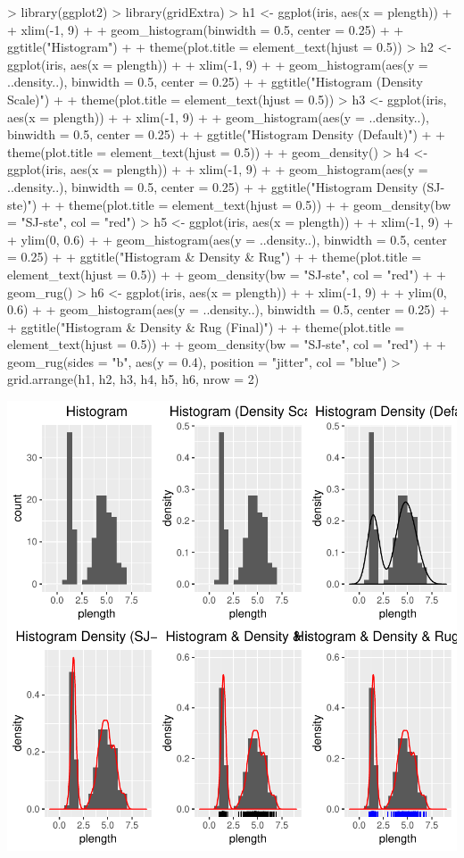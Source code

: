 \documentclass[12pt,letterpaper,final]{article}
\begin{document}
\begin{Schunk}
\begin{Sinput}
> library(ggplot2)
> library(gridExtra)
> h1 <- ggplot(iris, aes(x = plength)) +
+   xlim(-1, 9) +
+   geom_histogram(binwidth = 0.5, center = 0.25) +
+   ggtitle("Histogram") +
+   theme(plot.title = element_text(hjust = 0.5))
> h2 <- ggplot(iris, aes(x = plength)) +
+   xlim(-1, 9) +
+   geom_histogram(aes(y = ..density..), binwidth = 0.5, center = 0.25) +
+   ggtitle("Histogram (Density Scale)") +
+   theme(plot.title = element_text(hjust = 0.5))
> h3 <- ggplot(iris, aes(x = plength)) +
+   xlim(-1, 9) +
+   geom_histogram(aes(y = ..density..), binwidth = 0.5, center = 0.25) +
+   ggtitle("Histogram Density (Default)") +
+   theme(plot.title = element_text(hjust = 0.5)) +
+   geom_density()
> h4 <- ggplot(iris, aes(x = plength)) +
+   xlim(-1, 9) +
+   geom_histogram(aes(y = ..density..), binwidth = 0.5, center = 0.25) +
+   ggtitle("Histogram Density (SJ-ste)") +
+   theme(plot.title = element_text(hjust = 0.5)) +
+   geom_density(bw = "SJ-ste", col = "red")
> h5 <- ggplot(iris, aes(x = plength)) +
+   xlim(-1, 9) +
+   ylim(0, 0.6) +
+   geom_histogram(aes(y = ..density..), binwidth = 0.5, center = 0.25) +
+   ggtitle("Histogram & Density & Rug") +
+   theme(plot.title = element_text(hjust = 0.5)) +
+   geom_density(bw = "SJ-ste", col = "red") +
+   geom_rug()
> h6 <- ggplot(iris, aes(x = plength)) +
+   xlim(-1, 9) +
+   ylim(0, 0.6) +
+   geom_histogram(aes(y = ..density..), binwidth = 0.5, center = 0.25) +
+   ggtitle("Histogram & Density & Rug (Final)") +
+   theme(plot.title = element_text(hjust = 0.5)) +
+   geom_density(bw = "SJ-ste", col = "red") +
+   geom_rug(sides = "b", aes(y = 0.4), position = "jitter", col = "blue")
> grid.arrange(h1, h2, h3, h4, h5, h6, nrow = 2)
\end{Sinput}
\end{Schunk}
\includegraphics{lect_main-030}
\end{document}
